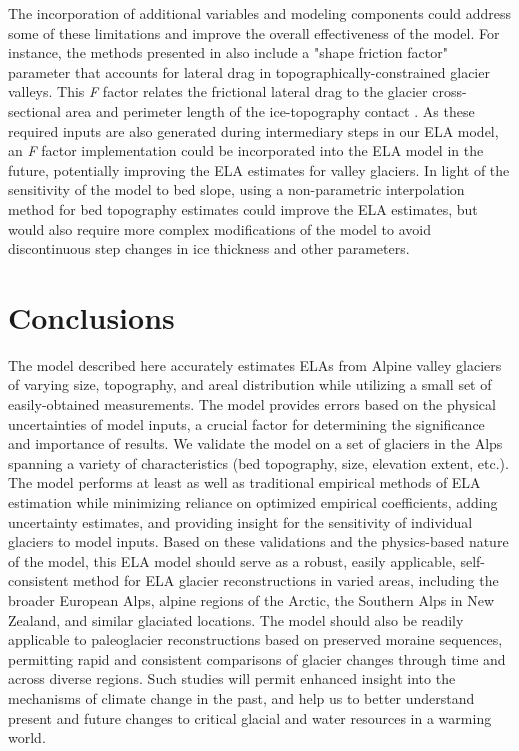 \documentclass[review]{elsarticle}
\begin{document}
The incorporation of additional variables and modeling components could address some of these limitations and improve the overall effectiveness of the model.
For instance, the methods presented in \cite{benn_exceltm_2010, pellitero_glare_2016} also include a "shape friction factor" parameter that accounts for lateral drag in topographically-constrained glacier valleys.
This \textit{F} factor relates the frictional lateral drag to the glacier cross-sectional area and perimeter length of the ice-topography contact \cite{pellitero_glare_2016}.
As these required inputs are also generated during intermediary steps in our ELA model, an \textit{F} factor implementation could be incorporated into the ELA model in the future, potentially improving the ELA estimates for valley glaciers.
In light of the sensitivity of the model to bed slope, using a non-parametric interpolation method for bed topography estimates could improve the ELA estimates, but would also require more complex modifications of the model to avoid discontinuous step changes in ice thickness and other parameters.

\section{Conclusions}

The model described here accurately estimates ELAs from Alpine valley glaciers of varying size, topography, and areal distribution while utilizing a small set of easily-obtained measurements.
The model provides errors based on the physical uncertainties of model inputs, a crucial factor for determining the significance and importance of results.
We validate the model on a set of glaciers in the Alps spanning a variety of characteristics (bed topography, size, elevation extent, etc.).
The model performs at least as well as traditional empirical methods of ELA estimation while minimizing reliance on optimized empirical coefficients, adding uncertainty estimates, and providing insight for the sensitivity of individual glaciers to model inputs.
Based on these validations and the physics-based nature of the model, this ELA model should serve as a robust, easily applicable, self-consistent method for ELA glacier reconstructions in varied areas, including the broader European Alps, alpine regions of the Arctic, the Southern Alps in New Zealand, and similar glaciated locations.
The model should also be readily applicable to paleoglacier reconstructions based on preserved moraine sequences, permitting rapid and consistent comparisons of glacier changes through time and across diverse regions.
Such studies will permit enhanced insight into the mechanisms of climate change in the past, and help us to better understand present and future changes to critical glacial and water resources in a warming world.



\end{document}
